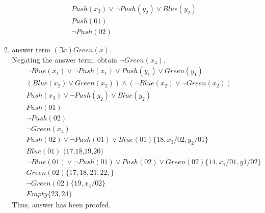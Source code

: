 \normalfont\documentclass[letterpaper,11pt]{article}
\begin{document}
\begin{enumerate}
\begin{enumerate}
\begin{eqnarray*}
		&& Push(x_3) \lor \neg Push(y_2)\lor Blue(y_2)\\
		&&Push(01)\\
		&&\neg Push(02)
	\end{eqnarray*}
	\item
	answer term $(\exists x) Green(x)$.\\
	 Negating the answer term, obtain $\neg Green(x_4)$.
	\begin{eqnarray}
		&&\neg Blue(x_1)\lor \neg Push(x_1) \lor Push(y_1) \lor Green(y_1)\\
		&&(Blue(x_2)\lor Green(x_2)) \land (\neg Blue(x_2) \lor \neg Green(x_2))\\
		&& Push(x_3) \lor \neg Push(y_2)\lor Blue(y_2)\\
		&&Push(01)\\
		&&\neg Push(02)\\
		&&\neg Green(x_4)\\
		&&Push(02) \lor \neg Push(01)\lor Blue(01) \{ 18, x_3/02, y_2/01\} \\
		&&Blue(01) \text{ (17,18,19,20)}\\
		&&\neg Blue(01)\lor \neg Push(01) \lor Push(02) \lor Green(02)\{14, x_1/01,y1/02 \} \\
		&&Green(02)\{17,18,21,22,\}\\
		&&\neg Green(02)\{19, x_4/02\}\\
		&&Empty\{23,24\}
	\end{eqnarray}
	Thus, answer has been proofed.
\end{enumerate}
\end{enumerate}
\end{document}
